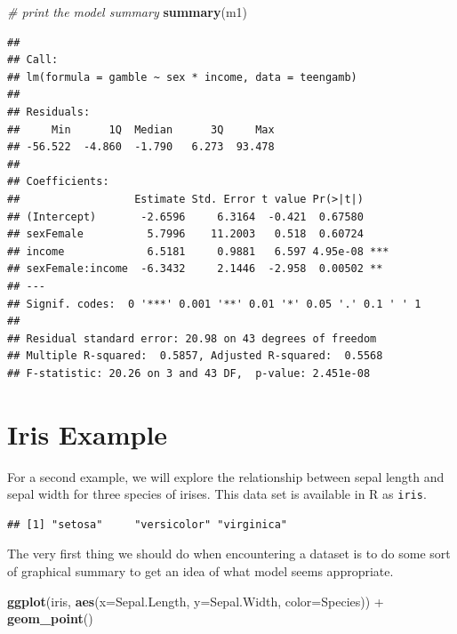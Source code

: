\documentclass[]{book}
\newenvironment{Shaded}{\begin{snugshade}}{\end{snugshade}}
\newcommand{\KeywordTok}[1]{\textcolor[rgb]{0.13,0.29,0.53}{\textbf{{#1}}}}
\newcommand{\DataTypeTok}[1]{\textcolor[rgb]{0.13,0.29,0.53}{{#1}}}
\newcommand{\StringTok}[1]{\textcolor[rgb]{0.31,0.60,0.02}{{#1}}}
\newcommand{\CommentTok}[1]{\textcolor[rgb]{0.56,0.35,0.01}{\textit{{#1}}}}
\newcommand{\NormalTok}[1]{{#1}}
\theoremstyle{definition}
\theoremstyle{definition}
\theoremstyle{remark}
\begin{document}
\begin{Shaded}
\begin{Highlighting}[]
\CommentTok{# print the model summary}
\KeywordTok{summary}\NormalTok{(m1)}
\end{Highlighting}
\end{Shaded}

\begin{verbatim}
## 
## Call:
## lm(formula = gamble ~ sex * income, data = teengamb)
## 
## Residuals:
##     Min      1Q  Median      3Q     Max 
## -56.522  -4.860  -1.790   6.273  93.478 
## 
## Coefficients:
##                  Estimate Std. Error t value Pr(>|t|)    
## (Intercept)       -2.6596     6.3164  -0.421  0.67580    
## sexFemale          5.7996    11.2003   0.518  0.60724    
## income             6.5181     0.9881   6.597 4.95e-08 ***
## sexFemale:income  -6.3432     2.1446  -2.958  0.00502 ** 
## ---
## Signif. codes:  0 '***' 0.001 '**' 0.01 '*' 0.05 '.' 0.1 ' ' 1
## 
## Residual standard error: 20.98 on 43 degrees of freedom
## Multiple R-squared:  0.5857, Adjusted R-squared:  0.5568 
## F-statistic: 20.26 on 3 and 43 DF,  p-value: 2.451e-08
\end{verbatim}

\section{Iris Example}\label{iris-example}

For a second example, we will explore the relationship between sepal
length and sepal width for three species of irises. This data set is
available in R as \texttt{iris}.

\begin{Shaded}
\end{Shaded}

\begin{verbatim}
## [1] "setosa"     "versicolor" "virginica"
\end{verbatim}

The very first thing we should do when encountering a dataset is to do
some sort of graphical summary to get an idea of what model seems
appropriate.

\begin{Shaded}
\begin{Highlighting}[]
\KeywordTok{ggplot}\NormalTok{(iris, }\KeywordTok{aes}\NormalTok{(}\DataTypeTok{x=}\NormalTok{Sepal.Length, }\DataTypeTok{y=}\NormalTok{Sepal.Width, }\DataTypeTok{color=}\NormalTok{Species)) +}
\StringTok{  }\KeywordTok{geom_point}\NormalTok{()}
\end{Highlighting}
\end{Shaded}
\end{document}

